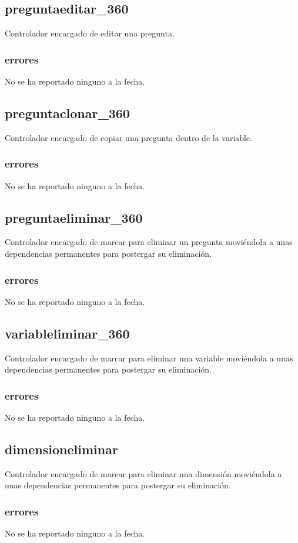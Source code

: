 \documentclass[10pt,a4paper]{book}
\begin{document}
	\subsection{preguntaeditar\_360}
	Controlador encargado de editar una pregunta.
	\subsubsection{errores}
	No se ha reportado ninguno a la fecha.

	\subsection{preguntaclonar\_360}
	Controlador encargado de copiar una pregunta dentro de la variable.
	\subsubsection{errores}
	No se ha reportado ninguno a la fecha.

	\subsection{preguntaeliminar\_360}
	Controlador encargado de marcar para eliminar un pregunta moviéndola a unas dependencias permanentes para postergar su eliminación.
	\subsubsection{errores}
	No se ha reportado ninguno a la fecha.

	\subsection{variableliminar\_360}
	Controlador encargado de marcar para eliminar una variable moviéndola a unas dependencias permanentes para postergar su eliminación.
	\subsubsection{errores}
	No se ha reportado ninguno a la fecha.

	\subsection{dimensioneliminar}
	Controlador encargado de marcar para eliminar una dimensión moviéndola a unas dependencias permanentes para postergar su eliminación.
	\subsubsection{errores}
	No se ha reportado ninguno a la fecha.
\end{document}
